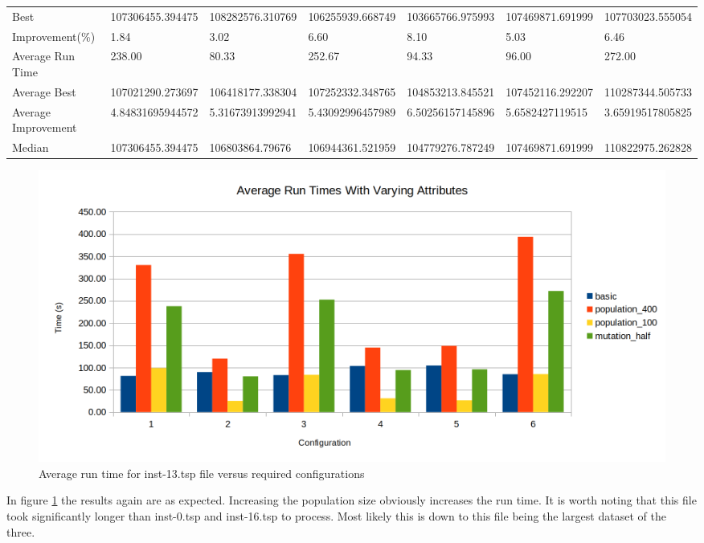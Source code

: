 \begin{table}[H]
{\begin{tabular}{lllllll}
\cellcolor[HTML]{ECF4FF}Best                & 107306455.394475 & 108282576.310769 & 106255939.668749 & 103665766.975993 & 107469871.691999 & 107703023.555054 \\
\cellcolor[HTML]{ECF4FF}Improvement(\%)     & 1.84             & 3.02             & 6.60             & 8.10             & 5.03             & 6.46             \\
\rowcolor[HTML]{CBCEFB} 
\cellcolor[HTML]{DAE8FC}Average Run Time    & 238.00           & 80.33            & 252.67           & 94.33            & 96.00            & 272.00           \\
\rowcolor[HTML]{CBCEFB} 
\cellcolor[HTML]{DAE8FC}Average Best        & 107021290.273697 & 106418177.338304 & 107252332.348765 & 104853213.845521 & 107452116.292207 & 110287344.505733 \\
\rowcolor[HTML]{CBCEFB} 
\cellcolor[HTML]{DAE8FC}Average Improvement & 4.84831695944572 & 5.31673913992941 & 5.43092996457989 & 6.50256157145896 & 5.6582427119515  & 3.65919517805825 \\
\rowcolor[HTML]{CBCEFB} 
\cellcolor[HTML]{DAE8FC}Median              & 107306455.394475 & 106803864.79676  & 106944361.521959 & 104779276.787249 & 107469871.691999 & 110822975.262828
\end{tabular}%
}
\end{table}

\begin{figure}[H]
\vspace{-5pt}
\centering
\includegraphics[width=1.0\textwidth]{images/inst-13-run-time.png}
\caption{\label{fig:inst-13-run-time}Average run time for inst-13.tsp file versus required configurations}
\end{figure}

In figure \ref{fig:inst-13-run-time} the results again are as expected. Increasing the population size obviously increases the run time. It is worth noting that this file took significantly longer than inst-0.tsp and inst-16.tsp to process. Most likely this is down to this file being the largest dataset of the three.

